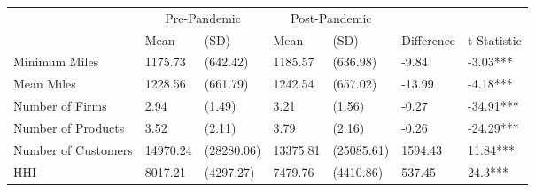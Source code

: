 
\begin{tabular}[t]{lllllll}
\toprule
\multicolumn{1}{c}{ } & \multicolumn{2}{c}{Pre-Pandemic} & \multicolumn{2}{c}{Post-Pandemic} & \multicolumn{2}{c}{ } \\
\cmidrule(l{3pt}r{3pt}){2-3} \cmidrule(l{3pt}r{3pt}){4-5}
 & Mean & (SD) & Mean & (SD) & Difference & t-Statistic\\
\midrule
Minimum Miles & 1175.73 & (642.42) & 1185.57 & (636.98) & -9.84 & -3.03***\\
Mean Miles & 1228.56 & (661.79) & 1242.54 & (657.02) & -13.99 & -4.18***\\
Number of Firms & 2.94 & (1.49) & 3.21 & (1.56) & -0.27 & -34.91***\\
Number of Products & 3.52 & (2.11) & 3.79 & (2.16) & -0.26 & -24.29***\\
Number of Customers & 14970.24 & (28280.06) & 13375.81 & (25085.61) & 1594.43 & 11.84***\\
\addlinespace
HHI & 8017.21 & (4297.27) & 7479.76 & (4410.86) & 537.45 & 24.3***\\
\bottomrule
\end{tabular}
